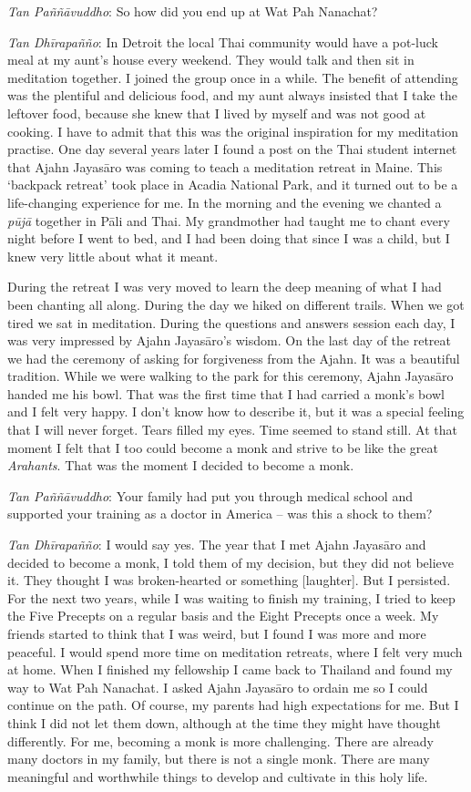 \emph{Tan Paññāvuddho}: So how did you end up at Wat Pah Nanachat? 

\emph{Tan Dhīrapañño}: In Detroit the local Thai community would have a
pot-luck meal at my aunt's house every weekend. They would talk and then
sit in meditation together. I joined the group once in a while. The
benefit of attending was the plentiful and delicious food, and my aunt
always insisted that I take the leftover food, because she knew that I
lived by myself and was not good at cooking. I have to admit that this
was the original inspiration for my meditation practise. One day several
years later I found a post on the Thai student internet that Ajahn
Jayasāro was coming to teach a meditation retreat in Maine. This
`backpack retreat' took place in Acadia National Park, and it turned out
to be a life-changing experience for me. In the morning and the evening
we chanted a \emph{pūjā} together in Pāli and Thai. My grandmother had
taught me to chant every night before I went to bed, and I had been
doing that since I was a child, but I knew very little about what it
meant.

During the retreat I was very moved to learn the deep meaning of
what I had been chanting all along. During the day we hiked on different
trails. When we got tired we sat in meditation. During the questions and
answers session each day, I was very impressed by Ajahn Jayasāro's
wisdom. On the last day of the retreat we had the ceremony of asking for
forgiveness from the Ajahn. It was a beautiful tradition. While we were
walking to the park for this ceremony, Ajahn Jayasāro handed me his
bowl. That was the first time that I had carried a monk's bowl and I
felt very happy. I don't know how to describe it, but it was a special
feeling that I will never forget. Tears filled my eyes. Time seemed to
stand still. At that moment I felt that I too could become a monk and
strive to be like the great \emph{Arahants}. That was the moment I
decided to become a monk. 

\emph{Tan Paññāvuddho}: Your family had put you through medical school
and supported your training as a doctor in America -- was this a shock
to them? 

\emph{Tan Dhīrapañño}: I would say yes. The year that I met Ajahn
Jayasāro and decided to become a monk, I told them of my decision, but
they did not believe it. They thought I was broken-hearted or something
[laughter]. But I persisted. For the next two years, while I was
waiting to finish my training, I tried to keep the Five Precepts on a
regular basis and the Eight Precepts once a week. My friends started to
think that I was weird, but I found I was more and more peaceful. I
would spend more time on meditation retreats, where I felt very much at
home. When I finished my fellowship I came back to Thailand and found my
way to Wat Pah Nanachat. I asked Ajahn Jayasāro to ordain me so I could
continue on the path. Of course, my parents had high expectations for
me. But I think I did not let them down, although at the time they might
have thought differently. For me, becoming a monk is more challenging. 
There are already many doctors in my family, but there is not a single
monk. There are many meaningful and worthwhile things to develop and
cultivate in this holy life. 

